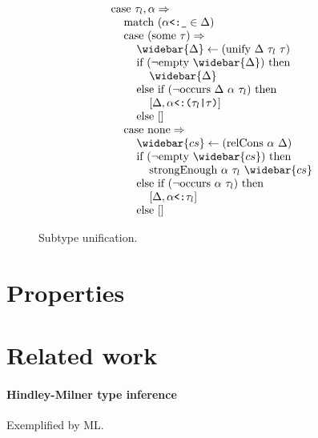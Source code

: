 \documentclass[acmsmall]{acmart}
\begin{document}
\begin{figure*}[h]
\[\begin{array}[t]{@{} l}
\end{array}
\begin{array}[t]{@{} l}
    \I \text{case } \tau_l, \alpha \Rightarrow 
    \\
    \I\I \text{match } (\code{$\alpha$<:\_} \in \Delta)
    \\
    \I\I \text{case } (\text{some } \tau) \Rightarrow
    \\
    \I\I\I \widebar{\Delta} \leftarrow (\text{unify } \Delta\ \tau_l\ \tau)
    \\
    \I\I\I \text{if } (\neg \text{empty } \widebar{\Delta}) \text{ then }
    \\
    \I\I\I\I \widebar{\Delta}
    \\
    \I\I\I \text{else if } (\neg \text{occurs } \Delta\ \alpha\ \tau_l) \text{ then }
    \\
    \I\I\I\I [\Delta,\code{$\alpha$<:($\tau_l$|$\tau$)}] 
    \\
    \I\I\I \text{else } [] 
    \\
    \I\I \text{case } \text{none} \Rightarrow
    \\
    \I\I\I \widebar{cs} \leftarrow (\text{relCons } \alpha\ \Delta)  
    \\
    \I\I\I \text{if } (\neg \text{empty } \widebar{cs}) \text{ then }
    \\
    \I\I\I\I \text{strongEnough } \alpha\ \tau_l\ \widebar{cs}  
    \\
    \I\I\I \text{else if } (\neg \text{occurs } \alpha\ \tau_l) \text{ then }
    \\
    \I\I\I\I [\Delta,\code{$\alpha$<:$\tau_l$}] 
    \\
    \I\I\I \text{else } []
\end{array}
\]

\caption{Subtype unification.}
\end{figure*}



\section{Properties}

\section{Related work}

\paragraph{Hindley-Milner type inference}
Exemplified by ML.
\end{document}
